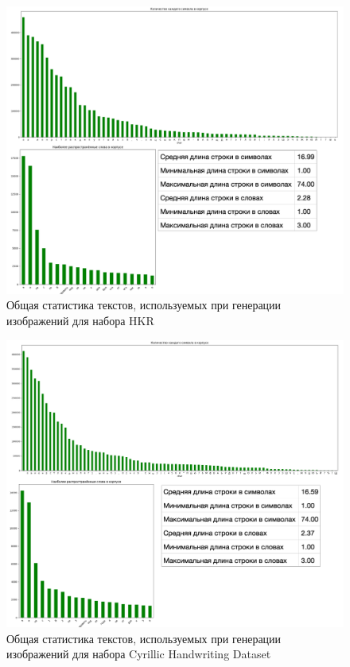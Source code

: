 \begin{figure}[h!]
    \centering
    \includegraphics[width=\textwidth]{img/hkr_statistics}
    \caption{Общая статистика текстов, используемых при генерации изображений для набора HKR}
    \label{fig:text_statistics_hkr}
\end{figure}

\begin{figure}[h!]
    \centering
    \includegraphics[width=\textwidth]{img/cyrillic_statistics}
    \caption{Общая статистика текстов, используемых при генерации изображений для набора Cyrillic Handwriting Dataset}
    \label{fig:text_statistics_cyrillic}
\end{figure}


